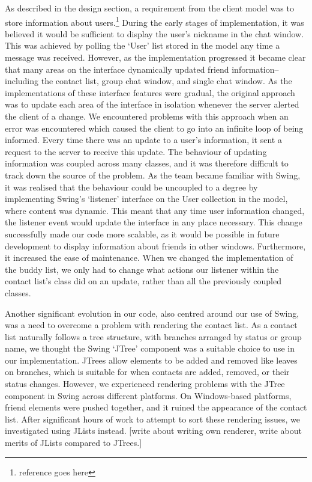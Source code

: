 As described in the design section, a requirement from the client model was to store information about users.\footnote{reference goes here} During the early stages of implementation, it was believed it would be sufficient to display the user's nickname in the chat window. This was achieved by polling the `User' list stored in the model any time a message was received. However, as the implementation progressed it became clear that many areas on the interface dynamically updated friend information--including the contact list, group chat window, and single chat window. As the implementations of these interface features were gradual, the original approach was to update each area of the interface in isolation whenever the server alerted the client of a change. We encountered problems with this approach when an error was encountered which caused the client to go into an infinite loop of being informed. Every time there was an update to a user's information, it sent a request to the server to receive this update. The behaviour of updating information was coupled across many classes, and it was therefore difficult to track down the source of the problem. As the team became familiar with Swing, it was realised that the behaviour could be uncoupled to a degree by implementing Swing's `listener' interface on the User collection in the model, where content was dynamic. This meant that any time user information changed, the listener event would update the interface in any place necessary. This change successfully made our code more scalable, as it would be possible in future development to display information about friends in other windows. Furthermore, it increased the ease of maintenance. When we changed the implementation of the buddy list, we only had to change what actions our listener within the contact list's class did on an update, rather than all the previously coupled classes. 

Another significant evolution in our code, also centred around our use of Swing, was a need to overcome a problem with rendering the contact list. As a contact list naturally follows a tree structure, with branches arranged by status or group name, we thought the Swing `JTree' component was a suitable choice to use in our implementation. JTrees allow elements to be added and removed like leaves on branches, which is suitable for when contacts are added, removed, or their status changes. However, we experienced rendering problems with the JTree component in Swing across different platforms. On Windows-based platforms, friend elements were pushed together, and it ruined the appearance of the contact list. After significant hours of work to attempt to sort these rendering issues, we investigated using JLists instead. [write about writing own renderer, write about merits of JLists compared to JTrees.]

